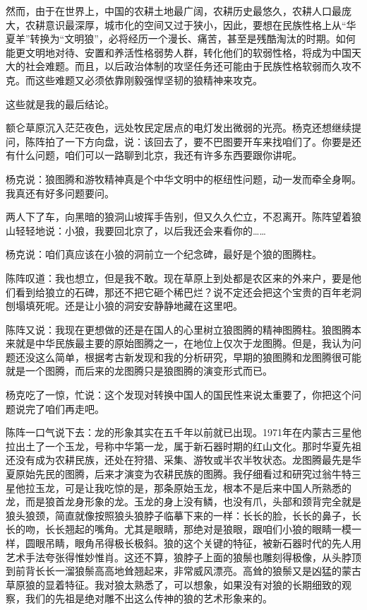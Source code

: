 \par 然而，由于在世界上，中国的农耕土地最广阔，农耕历史最悠久，农耕人口最庞大，农耕意识最深厚，城市化的空间又过于狭小，因此，要想在民族性格上从“华夏羊”转换为“文明狼”，必将经历一个漫长、痛苦，甚至是残酷淘汰的时期。如何能更文明地对待、安置和养活性格弱势人群，转化他们的软弱性格，将成为中国天大的社会难题。而且，以后政治体制的攻坚任务还可能由于民族性格软弱而久攻不克。而这些难题又必须依靠刚毅强悍坚韧的狼精神来攻克。
\par 这些就是我的最后结论。
\par 
\par 额仑草原沉入茫茫夜色，远处牧民定居点的电灯发出微弱的光亮。杨克还想继续提问，陈阵拍了一下方向盘，说：该回去了，要不巴图要开车来找咱们了。你要是还有什么问题，咱们可以一路聊到北京，我还有许多东西要跟你讲呢。
\par 杨克说：狼图腾和游牧精神真是个中华文明中的枢纽性问题，动一发而牵全身啊。我真还有好多问题要问。
\par 两人下了车，向黑暗的狼洞山坡挥手告别，但又久久伫立，不忍离开。陈阵望着狼山轻轻地说：小狼，我要回北京了，以后我还会来看你的……
\par 杨克说：咱们真应该在小狼的洞前立一个纪念碑，最好是个狼的图腾柱。
\par 陈阵叹道：我也想立，但是我不敢。现在草原上到处都是农区来的外来户，要是他们看到给狼立的石碑，那还不把它砸个稀巴烂？说不定还会把这个宝贵的百年老洞刨塌填死呢。还是让小狼的洞安安静静地藏在这里吧。
\par 陈阵又说：我现在更想做的还是在国人的心里树立狼图腾的精神图腾柱。狼图腾本来就是中华民族最主要的原始图腾之一，在地位上仅次于龙图腾。但是，我认为问题还没这么简单，根据考古新发现和我的分析研究，早期的狼图腾和龙图腾很可能就是一个图腾，而后来的龙图腾只是狼图腾的演变形式而已。
\par 杨克吃了一惊，忙说：这个发现对转换中国人的国民性来说太重要了，你把这个问题说完了咱们再走吧。
\par 陈阵一口气说下去：龙的形象其实在五千年以前就已出现。1971年在内蒙古三星他拉出土了一个玉龙，号称中华第一龙，属于新石器时期的红山文化。那时华夏先祖还没有成为农耕民族，还处在狩猎、采集、游牧或半农半牧状态。龙图腾最先是华夏原始先民的图腾，后来才演变为农耕民族的图腾。我仔细看过和研究过翁牛特三星他拉玉龙，可是让我吃惊的是，那条原始玉龙，根本不是后来中国人所熟悉的龙，而是狼首龙身形象的龙。玉龙的身上没有鳞，也没有爪，头部和颈背完全就是狼头狼颈，简直就像按照狼头狼脖子临摹下来的一样：长长的脸，长长的鼻子，长长的吻，长长翘起的嘴角。尤其是眼睛，那绝对是狼眼，跟咱们小狼的眼睛一模一样，圆眼吊睛，眼角吊得极长极斜。狼的这个关键的特征，被新石器时代的先人用艺术手法夸张得惟妙惟肖。这还不算，狼脖子上面的狼鬃也雕刻得极像，从头脖顶到前背长长一溜狼鬃高高地耸翘起来，非常威风漂亮。高耸的狼鬃又是凶猛的蒙古草原狼的显着特征。我对狼太熟悉了，可以想象，如果没有对狼的长期细致的观察，我们的先祖是绝对雕不出这么传神的狼的艺术形象来的。
